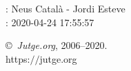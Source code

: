 \documentclass[11pt]{article}
\begin{document}
    \newcommand{\SampleTwoCol}{\SampleTwoColInputOutput{sample1}{}}
    \newcommand{\SampleOneCol}{\SampleOneColInputOutput{sample1}{}}

    \ProblemInformation
    \Author: Neus Català - Jordi Esteve\\    
    \Generation: 2020-04-24 17:55:57

    \bigskip

    \copyright\ \emph{Jutge.org}, 2006--2020. \\
    https:$/\!\!/$jutge.org
\end{document}
